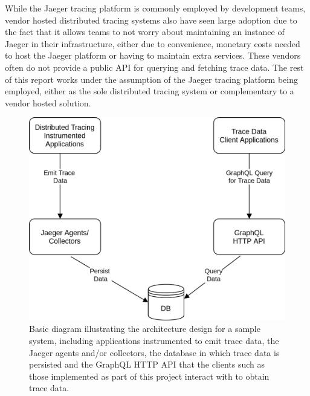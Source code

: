 \documentclass[12pt,pdftex,titlepage]{report}
\begin{document}
                While the Jaeger tracing platform is commonly employed by development teams, vendor hosted distributed tracing systems also have seen large adoption due to the 
                fact that it allows teams to not worry about maintaining an instance of Jaeger in their infrastructure, either due to convenience, monetary costs needed to host
                the Jaeger platform or having to maintain extra services. These vendors often do not provide a public API for querying and fetching trace data. The rest of this 
                report works under the assumption of the Jaeger tracing platform being employed, either as the sole distributed tracing system or complementary to a vendor hosted solution. 

            \begin{figure}[hbt!]
                \centering
                \includegraphics[scale=0.2]{arch.png}
                \caption[Diagram of the system proposed for the project]{Basic diagram illustrating the architecture design for a sample system, including applications instrumented to emit trace 
                data, the Jaeger agents and/or collectors, the database in which trace data is persisted and the GraphQL HTTP API that the clients such as those implemented as part of this project 
                interact with to obtain trace data.}
                \label{fig:arch}
            \end{figure}
\end{document}
